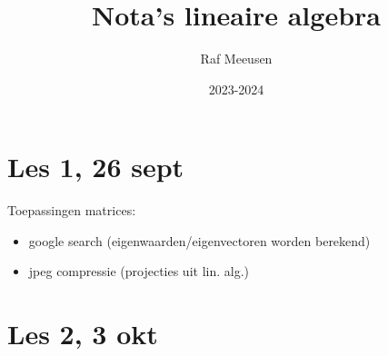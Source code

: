 \documentclass{article}
\title{Nota's lineaire algebra}
\author{Raf Meeusen}
\date{2023-2024}
\begin{document}
\maketitle

\section{Les 1, 26 sept}

Toepassingen matrices: 
\begin{itemize}
\item google search (eigenwaarden/eigenvectoren worden berekend) 
\item jpeg compressie (projecties uit lin. alg.) 
\end{itemize}

\section{Les 2, 3 okt}
\end{document}

